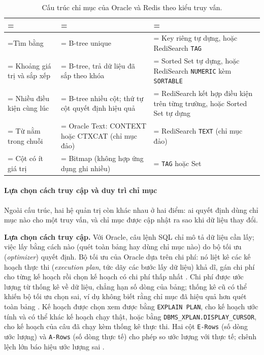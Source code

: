 \begin{table}[!htbp]
\centering
\caption{Cấu trúc chỉ mục của Oracle và Redis theo kiểu truy vấn.}\label{tab:ix-index-types}
\reporttablesetup
\begin{tabularx}{\linewidth}{|>{\hsize\linewidth=\hsize}L|>{\hsize\linewidth=\hsize}L|>{\hsize\linewidth=\hsize}L|}
\hline
{}
 &  &  \\ \hline
Tìm bằng & B-tree unique & Key riêng tự dựng, hoặc RediSearch \texttt{TAG} \\ \hline
Khoảng giá trị và sắp xếp & B-tree, trả dữ liệu đã sắp theo khóa & Sorted Set tự dựng, hoặc RediSearch \texttt{NUMERIC} kèm \texttt{SORTABLE} \\ \hline
Nhiều điều kiện cùng lúc & B-tree nhiều cột; thứ tự cột quyết định hiệu quả & RediSearch kết hợp điều kiện trên từng trường, hoặc Sorted Set tự dựng \\ \hline
Từ nằm trong chuỗi & Oracle Text: CONTEXT hoặc CTXCAT (chỉ mục đảo) & RediSearch \texttt{TEXT} (chỉ mục đảo) \\ \hline
Cột có ít giá trị & Bitmap (không hợp ứng dụng ghi nhiều) & \texttt{TAG} hoặc Set \\ \hline
\end{tabularx}
\end{table}

\paragraph{Lựa chọn cách truy cập và duy trì chỉ mục}\label{sec:ix-operation}

Ngoài cấu trúc, hai hệ quản trị còn khác nhau ở hai điểm: ai quyết định dùng chỉ mục nào cho một truy vấn, và chỉ mục được cập nhật ra sao khi dữ liệu thay đổi.

\noindent\textbf{Lựa chọn cách truy cập.} Với Oracle, câu lệnh SQL chỉ mô tả dữ liệu cần lấy; việc lấy bằng cách nào (quét toàn bảng hay dùng chỉ mục nào) do bộ tối ưu (\emph{optimizer}) quyết định. Bộ tối ưu của Oracle dựa trên chi phí: nó liệt kê các kế hoạch thực thi (\emph{execution plan}, tức dãy các bước lấy dữ liệu) khả dĩ, gán chi phí cho từng kế hoạch rồi chọn kế hoạch có chi phí thấp nhất \cite{oracleAccessPaths}. Chi phí được ước lượng từ thống kê về dữ liệu, chẳng hạn số dòng của bảng; thống kê cũ có thể khiến bộ tối ưu chọn sai, ví dụ không biết rằng chỉ mục đã hiệu quả hơn quét toàn bảng \cite{oracleAccessPaths}. Kế hoạch được chọn xem được bằng \texttt{EXPLAIN PLAN}, cho kế hoạch ước tính và có thể khác kế hoạch chạy thật, hoặc bằng \texttt{DBMS\_XPLAN.DISPLAY\_CURSOR}, cho kế hoạch của câu đã chạy kèm thống kê thực thi. Hai cột \texttt{E-Rows} (số dòng ước lượng) và \texttt{A-Rows} (số dòng thực tế) cho phép so ước lượng với thực tế; chênh lệch lớn báo hiệu ước lượng sai \cite{oracleExecutionPlans}.

